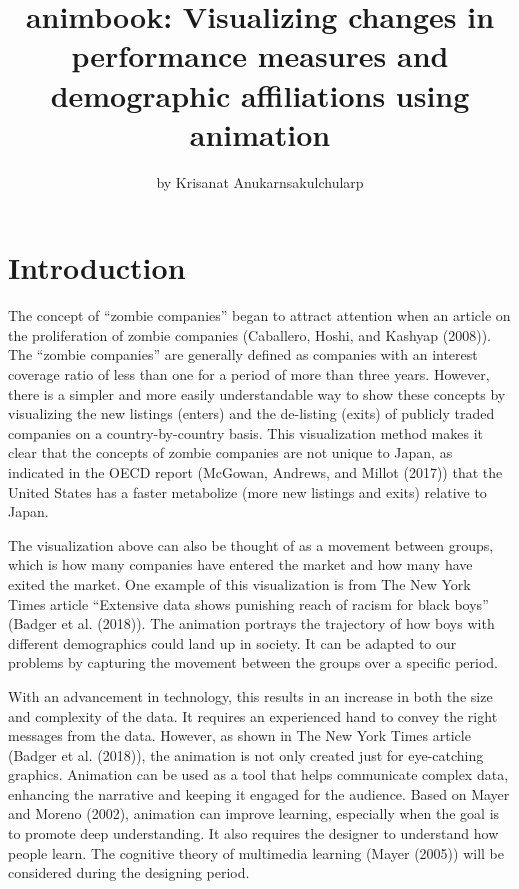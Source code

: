 \title{animbook: Visualizing changes in performance measures and demographic affiliations using animation}


\author{by Krisanat Anukarnsakulchularp}

\maketitle


\hypertarget{introduction}{%
\section{Introduction}\label{introduction}}

The concept of ``zombie companies'' began to attract attention when an article on the proliferation of zombie companies (Caballero, Hoshi, and Kashyap (2008)). The ``zombie companies'' are generally defined as companies with an interest coverage ratio of less than one for a period of more than three years. However, there is a simpler and more easily understandable way to show these concepts by visualizing the new listings (enters) and the de-listing (exits) of publicly traded companies on a country-by-country basis. This visualization method makes it clear that the concepts of zombie companies are not unique to Japan, as indicated in the OECD report (McGowan, Andrews, and Millot (2017)) that the United States has a faster metabolize (more new listings and exits) relative to Japan.

The visualization above can also be thought of as a movement between groups, which is how many companies have entered the market and how many have exited the market. One example of this visualization is from The New York Times article ``Extensive data shows punishing reach of racism for black boys'' (Badger et al. (2018)). The animation portrays the trajectory of how boys with different demographics could land up in society. It can be adapted to our problems by capturing the movement between the groups over a specific period.

With an advancement in technology, this results in an increase in both the size and complexity of the data. It requires an experienced hand to convey the right messages from the data. However, as shown in The New York Times article (Badger et al. (2018)), the animation is not only created just for eye-catching graphics. Animation can be used as a tool that helps communicate complex data, enhancing the narrative and keeping it engaged for the audience. Based on Mayer and Moreno (2002), animation can improve learning, especially when the goal is to promote deep understanding. It also requires the designer to understand how people learn. The cognitive theory of multimedia learning (Mayer (2005)) will be considered during the designing period.


